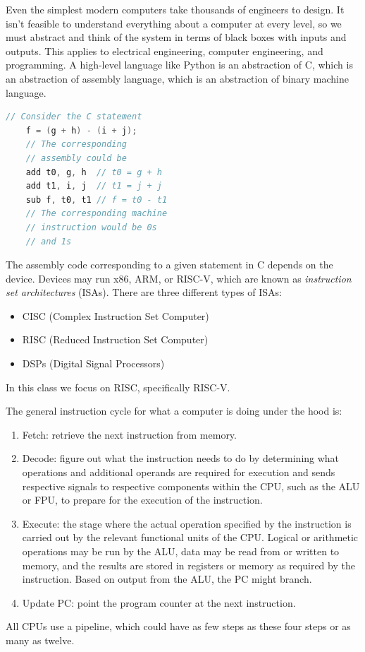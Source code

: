 Even the simplest modern computers take thousands
of engineers to design. It isn't feasible to
understand everything about a computer at every
level, so we must abstract and think of the system
in terms of black boxes with inputs and outputs. This
applies to electrical engineering, computer engineering,
and programming. A high-level language like Python is
an abstraction of C, which is an abstraction of assembly
language, which is an abstraction of binary machine language.
\begin{lstlisting}[language=C]
    // Consider the C statement
    f = (g + h) - (i + j);
    // The corresponding 
    // assembly could be
    add t0, g, h  // t0 = g + h
    add t1, i, j  // t1 = j + j
    sub f, t0, t1 // f = t0 - t1
    // The corresponding machine 
    // instruction would be 0s 
    // and 1s
\end{lstlisting}
The assembly code corresponding to a given statement in
C depends on the device. Devices may run x86, ARM, or RISC-V,
which are known as \emph{instruction set architectures} (ISAs).
There are three different types of ISAs:
\begin{itemize}
    \item CISC (Complex Instruction Set Computer)
    \item RISC (Reduced Instruction Set Computer)
    \item DSPs (Digital Signal Processors)
\end{itemize}
In this class we focus on RISC, specifically RISC-V.

The general instruction cycle for what a computer is doing under the
hood is:
\begin{enumerate}
    \item Fetch: retrieve the next instruction from memory.
    \item Decode: figure out what the instruction needs to do
          by determining what operations and additional operands
          are required for execution and sends respective signals
          to respective components within the CPU, such as the ALU
          or FPU, to prepare for the execution of the instruction.
    \item Execute: the stage where the actual operation
          specified by the instruction is carried out by the relevant
          functional units of the CPU. Logical or arithmetic operations
          may be run by the ALU, data may be read from or written to
          memory, and the results are stored in registers or memory as
          required by the instruction. Based on output from the ALU,
          the PC might branch.
    \item Update PC: point the program counter at the next instruction.
\end{enumerate}
All CPUs use a pipeline, which could have as few steps as these four
steps or as many as twelve.